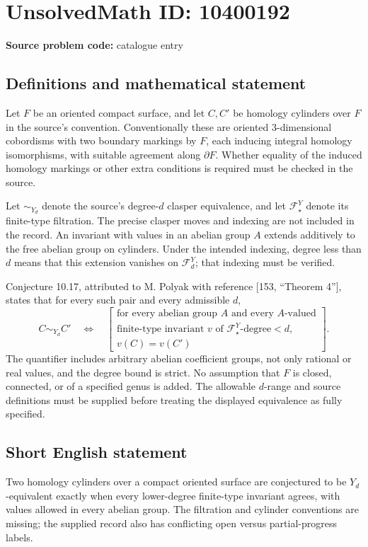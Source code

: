 \documentclass[11pt]{article}
\begin{document}
\section*{UnsolvedMath ID: 10400192}
\textbf{Source problem code:} catalogue entry
\subsection{Definitions and mathematical statement}
Let \(F\) be an oriented compact surface, and let \(C,C'\) be homology cylinders over \(F\) in the source's convention. Conventionally these are oriented \(3\)-dimensional cobordisms with two boundary markings by \(F\), each inducing integral homology isomorphisms, with suitable agreement along \(\partial F\). Whether equality of the induced homology markings or other extra conditions is required must be checked in the source.

Let \(\sim_{Y_d}\) denote the source's degree-\(d\) clasper equivalence, and let \(\mathcal F^Y_\star\) denote its finite-type filtration. The precise clasper moves and indexing are not included in the record. An invariant with values in an abelian group \(A\) extends additively to the free abelian group on cylinders. Under the intended indexing, degree less than \(d\) means that this extension vanishes on \(\mathcal F_d^Y\); that indexing must be verified.

Conjecture 10.17, attributed to M. Polyak with reference [153, ``Theorem 4''], states that for every such pair and every admissible \(d\),
\[
 C\sim_{Y_d}C'
 \quad\Longleftrightarrow\quad
 \left[\begin{array}{l}
 \text{for every abelian group }A\text{ and every }A\text{-valued}\\
 \text{finite-type invariant }v\text{ of }\mathcal F^Y_\star\text{-degree}<d,\\
 v(C)=v(C')
 \end{array}\right].
\]
The quantifier includes arbitrary abelian coefficient groups, not only rational or real values, and the degree bound is strict. No assumption that \(F\) is closed, connected, or of a specified genus is added. The allowable \(d\)-range and source definitions must be supplied before treating the displayed equivalence as fully specified.
\subsection{Short English statement}
Two homology cylinders over a compact oriented surface are conjectured to be \(Y_d\)-equivalent exactly when every lower-degree finite-type invariant agrees, with values allowed in every abelian group. The filtration and cylinder conventions are missing; the supplied record also has conflicting open versus partial-progress labels.
\end{document}
